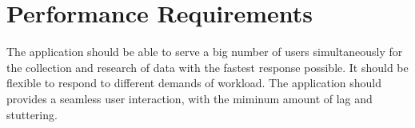 \section{Performance Requirements}
The application should be able to serve a big number of users simultaneously for the collection and research of data with the fastest response possible. It should be flexible to respond to different demands of workload. The application should provides a seamless user interaction, with the miminum amount of lag and stuttering.